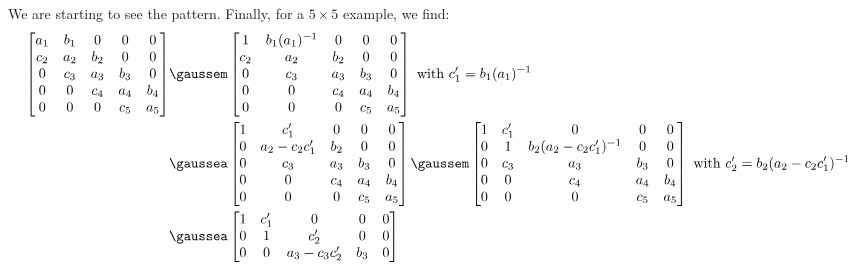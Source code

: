 We are starting to see the pattern. Finally, for a $5 \times 5$ example, we find:
\begin{align*}
    \begin{bmatrix}
        a_1 & b_1 & 0 & 0 & 0 \\
        c_2 & a_2 & b_2 & 0 & 0 \\
        0 & c_3 & a_3 & b_3 & 0 \\
        0 & 0 & c_4 & a_4 & b_4 \\
        0 & 0 & 0 & c_5 & a_5 \\
    \end{bmatrix} & \gaussem \begin{bmatrix}
        1 & b_1(a_1)^{-1} & 0 & 0 & 0 \\
        c_2 & a_2 & b_2 & 0 & 0 \\
        0 & c_3 & a_3 & b_3 & 0 \\
        0 & 0 & c_4 & a_4 & b_4 \\
        0 & 0 & 0 & c_5 & a_5 \\
    \end{bmatrix} \text{ with } c'_1 = b_1(a_1)^{-1} \\
    &\gaussea \begin{bmatrix}
        1 & c'_1 & 0 & 0 & 0 \\
        0 & a_2 - c_2c'_1 & b_2 & 0 & 0 \\
        0 & c_3 & a_3 & b_3 & 0 \\
        0 & 0 & c_4 & a_4 & b_4 \\
        0 & 0 & 0 & c_5 & a_5 \\
    \end{bmatrix} \gaussem \begin{bmatrix}
        1 & c'_1 & 0 & 0 & 0 \\
        0 & 1 & b_2(a_2 - c_2c'_1)^{-1} & 0 & 0 \\
        0 & c_3 & a_3 & b_3 & 0 \\
        0 & 0 & c_4 & a_4 & b_4 \\
        0 & 0 & 0 & c_5 & a_5 \\
    \end{bmatrix} \text{ with } c'_2 = b_2(a_2 - c_2c'_1)^{-1} \\
    &\gaussea \begin{bmatrix}
        1 & c'_1 & 0 & 0 & 0 \\
        0 & 1 & c'_2 & 0 & 0 \\
        0 & 0 & a_3 - c_3c'_2 & b_3 & 0 \\

\end{bmatrix}
\end{align*}
